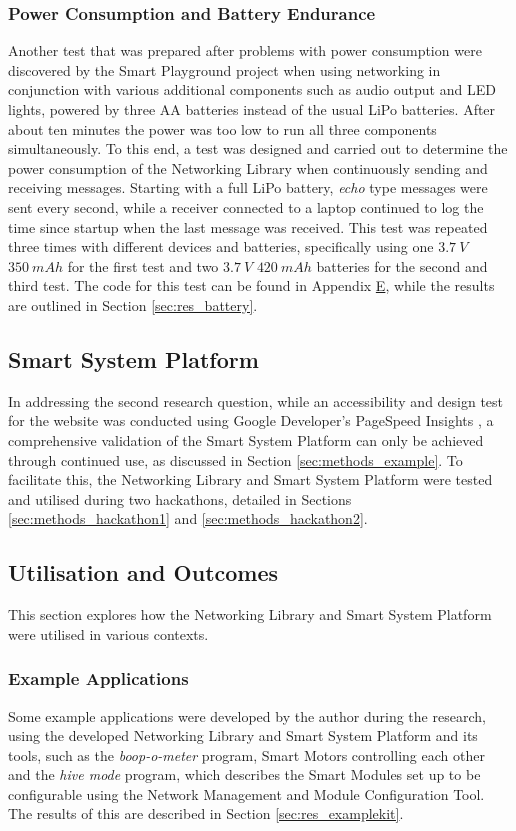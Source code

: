\subsubsection{\label{sec:methods_test_batter}Power Consumption and Battery Endurance}
Another test that was prepared after problems with power consumption were discovered by the Smart Playground project when using networking in conjunction with various additional components such as audio output and LED lights, powered by three AA batteries instead of the usual LiPo batteries. After about ten minutes the power was too low to run all three components simultaneously. To this end, a test was designed and carried out to determine the power consumption of the Networking Library when continuously sending and receiving messages. Starting with a full LiPo battery, \textit{echo} type messages were sent every second, while a receiver connected to a laptop continued to log the time since startup when the last message was received. This test was repeated three times with different devices and batteries, specifically using one $3.7\ V$ $350\ mAh$ for the first test and two $3.7\ V$ $420\ mAh$ batteries for the second and third test. The code for this test can be found in Appendix \hyperref[chap:apx_e]{E}, while the results are outlined in Section \ref{sec:res_battery}.

\subsection{\label{sec:methods_tools}Smart System Platform}
In addressing the second research question, while an accessibility and design test for the website was conducted using Google Developer's PageSpeed Insights \citep{noauthor_pagespeed_nodate}, a comprehensive validation of the Smart System Platform can only be achieved through continued use, as discussed in Section \ref{sec:methods_example}. To facilitate this, the Networking Library and Smart System Platform were tested and utilised during two hackathons, detailed in Sections \ref{sec:methods_hackathon1} and \ref{sec:methods_hackathon2}.

\subsection{\label{sec:methods_}Utilisation and Outcomes}
This section explores how the Networking Library and Smart System Platform were utilised in various contexts. 

\subsubsection{\label{sec:methods_example}Example Applications}
Some example applications were developed by the author during the research, using the developed Networking Library and Smart System Platform and its tools, such as the \textit{boop-o-meter} program, Smart Motors controlling each other and the \textit{hive mode} program, which describes the Smart Modules set up to be configurable using the Network Management and Module Configuration Tool. The results of this are described in Section \ref{sec:res_examplekit}.

